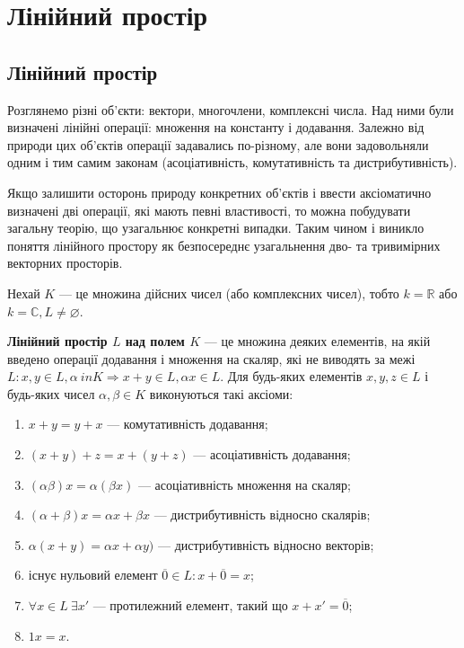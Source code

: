 \chapter{Лінійний простір}  %


\section{Лінійний простір}

Розглянемо різні об’єкти: вектори, многочлени, комплексні числа. Над ними
були визначені лінійні операції: множення на константу і додавання. Залежно від 
природи цих об’єктів операції задавались по-різному, але вони задовольняли одним
і тим самим законам (асоціативність, комутативність та дистрибутивність).

Якщо залишити осторонь природу конкретних об’єктів і ввести аксіоматично
визначені дві операції, які мають певні властивості, то можна побудувати загальну
теорію, що узагальнює конкретні випадки. Таким чином і виникло поняття
лінійного простору як безпосереднє узагальнення дво- та тривимірних векторних
просторів.

Нехай $K$ --- це множина дійсних чисел (або комплексних чисел), тобто $k = \mathbb{R}$
або $k = \mathbb{C}, L \neq \varnothing$. 

\begin{definition}
	\textbf{Лінійний простір $L$ над полем $K$} --- це множина деяких
	елементів, на якій введено операції додавання і множення на скаляр, які не
	виводять за межі $L : x, y \in L, \alpha \ in K \Rightarrow x + y \in L, \alpha x \in L$. Для будь-яких
	елементів $x, y, z \in L$ і будь-яких чисел $\alpha, \beta \in K$ виконуються такі аксіоми:
	\begin{enumerate}
		\item $x + y = y + x$ --- комутативність додавання;
		\item $(x+y)+z = x+(y+z)$ --- асоціативність додавання;
		\item $(\alpha \beta)x = \alpha (\beta x)$ --- асоціативність множення на скаляр;
		\item $(\alpha + \beta)x = \alpha x + \beta x$ --- дистрибутивність відносно скалярів;
		\item $\alpha(x + y) = \alpha x + \alpha y)$ --- дистрибутивність відносно векторів;
		\item існує нульовий елемент $\overline{0} \in L: x + \overline{0} = x$;
		\item $\forall x \in L \: \exists x'$ --- протилежний елемент, такий що $x + x' = \overline{0}$;
		\item $1 x = x$.
	\end{enumerate}
\end{definition}

